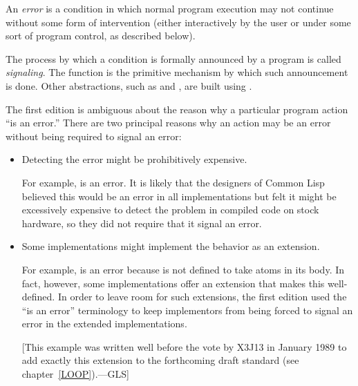 An \emph{error} is a condition in which normal program execution may not
continue without some form of intervention (either interactively by 
the user
or under some sort of program control, as described below).

The process by which a condition is formally announced by a program is called
\emph{signaling}. The function  is the primitive mechanism by which such
announcement is done. Other abstractions, such as  and , are built
using .

The first edition is ambiguous about the reason why a particular program action
``is an error.'' There are two principal reasons why an action may be an error
without being required to signal an error:
\begin{itemize}
\item Detecting the error might be prohibitively expensive.

   For example,  is an error. It is likely that the designers of
   Common Lisp believed this would be an error in all implementations but
   felt it might be excessively expensive to detect the problem
   in compiled code on stock hardware, so they did not require that it signal
   an error.

\item Some implementations might implement the behavior as an extension.

   For example,  is an error because 
   is not defined to take atoms in its body.
   In fact, however, some
   implementations offer an extension that makes this well-defined. In order
   to leave room for such extensions, the first edition used the ``is an error''
   terminology to keep implementors from being forced to signal an error in
   the extended implementations.

   [This example was written well before the vote by X3J13 in January 1989
    to add exactly this extension to the forthcoming draft standard
    (see chapter~\ref{LOOP}).---GLS]
\end{itemize}


